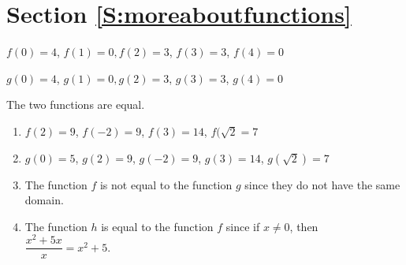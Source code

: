\section*{Section \ref{S:moreaboutfunctions}}
\renewcommand{\labelenumi}{(\textbf{\alph{enumi}})}

\begin{list}{\bf{\ref{exer:sec62-1}.}}
\item \begin{list}{\bf{(a)}}
\item $f( 0 ) = 4$, $f( 1 ) = 0, f( 2 ) = 3$, 
$f( 3 ) = 3$, $f( 4 ) = 0$
\end{list}
\end{list}


\begin{list}{}
\item \begin{list}{\bf{(b)}}
\item $g( 0 ) = 4$, $g( 1 ) = 0, g( 2 ) = 3$, 
$g( 3 ) = 3$, $g( 4 ) = 0$
\end{list}
\end{list}


\begin{list}{}
\item \begin{list}{\bf{(c)}}
\item The two functions are equal.
\end{list}
\end{list}




\begin{list}{\bf{\ref{exer62:realfunction}.}}
\item \begin{enumerate}
\item $f(2) = 9$, $f(-2) = 9$, $f(3) = 14$, $f(\sqrt{2} = 7$

\item $g(0) = 5$, $g(2) = 9$, $g(-2) = 9$, $g(3) = 14$, $g(\sqrt{2}) = 7$

\item The function $f$ is not equal to the function $g$ since they do not have the same domain.

\item The function $h$ is equal to the function $f$ since if $x \ne 0$, then 
$\dfrac{x^2 + 5x}{x} = x^2 + 5$.

\end{enumerate}

\end{list}


